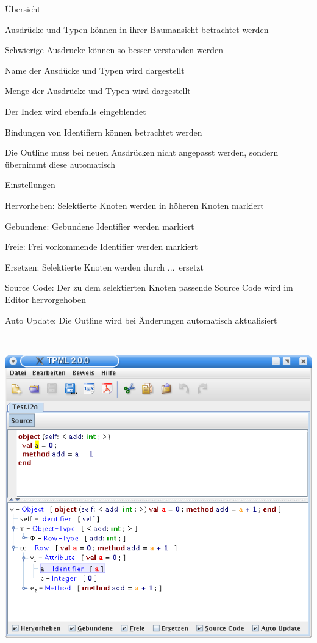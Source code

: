 {
  \begin{itemgroup}{Übersicht}
    \item Ausdrücke und Typen können in ihrer Baumansicht betrachtet werden
    \item Schwierige Ausdrucke können so besser verstanden werden
    \item Name der Ausdücke und Typen wird dargestellt
    \item Menge der Ausdrücke und Typen wird dargestellt
    \item Der Index wird ebenfalls eingeblendet
    \item Bindungen von Identifiern können betrachtet werden
    \item Die Outline muss bei neuen Ausdrücken nicht angepasst werden,
          sondern übernimmt diese automatisch
  \end{itemgroup}
}

{
  \begin{itemgroup}{Einstellungen}
    \item \glqq Hervorheben\grqq: Selektierte Knoten werden in höheren Knoten markiert
    \item \glqq Gebundene\grqq: Gebundene Identifier werden markiert
    \item \glqq Freie\grqq: Frei vorkommende Identifier werden markiert
    \item \glqq Ersetzen\grqq: Selektierte Knoten werden durch \glqq ...\grqq\ ersetzt
    \item \glqq Source Code\grqq: Der zu dem selektierten Knoten passende Source Code
                                  wird im Editor hervorgehoben
    \item \glqq Auto Update\grqq: Die Outline wird bei Änderungen automatisch aktualisiert
  \end{itemgroup}
}

{
  \begin{center}
    \includegraphics[height=14cm]{images/outline.png}
  \end{center}
}